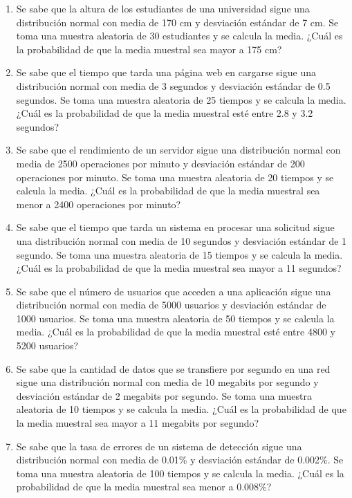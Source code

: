 \begin{Ejer}
\begin{enumerate}
\item Se sabe que la altura de los estudiantes de una universidad sigue una distribuci\'on normal con media de 170 cm y desviaci\'on est\'andar de 7 cm. Se toma una muestra aleatoria de 30 estudiantes y se calcula la media. ¿Cu\'al es la probabilidad de que la media muestral sea mayor a 175 cm?

\item Se sabe que el tiempo que tarda una p\'agina web en cargarse sigue una distribuci\'on normal con media de 3 segundos y desviaci\'on est\'andar de 0.5 segundos. Se toma una muestra aleatoria de 25 tiempos y se calcula la media. ¿Cu\'al es la probabilidad de que la media muestral est\'e entre 2.8 y 3.2 segundos?

\item Se sabe que el rendimiento de un servidor sigue una distribuci\'on normal con media de 2500 operaciones por minuto y desviaci\'on est\'andar de 200 operaciones por minuto. Se toma una muestra aleatoria de 20 tiempos y se calcula la media. ¿Cu\'al es la probabilidad de que la media muestral sea menor a 2400 operaciones por minuto?

\item Se sabe que el tiempo que tarda un sistema en procesar una solicitud sigue una distribuci\'on normal con media de 10 segundos y desviaci\'on est\'andar de 1 segundo. Se toma una muestra aleatoria de 15 tiempos y se calcula la media. ¿Cu\'al es la probabilidad de que la media muestral sea mayor a 11 segundos?

\item Se sabe que el n\'umero de usuarios que acceden a una aplicaci\'on sigue una distribuci\'on normal con media de 5000 usuarios y desviaci\'on est\'andar de 1000 usuarios. Se toma una muestra aleatoria de 50 tiempos y se calcula la media. ¿Cu\'al es la probabilidad de que la media muestral est\'e entre 4800 y 5200 usuarios?

\item Se sabe que la cantidad de datos que se transfiere por segundo en una red sigue una distribuci\'on normal con media de 10 megabits por segundo y desviaci\'on est\'andar de 2 megabits por segundo. Se toma una muestra aleatoria de 10 tiempos y se calcula la media. ¿Cu\'al es la probabilidad de que la media muestral sea mayor a 11 megabits por segundo?

\item Se sabe que la tasa de errores de un sistema de detecci\'on sigue una distribuci\'on normal con media de 0.01\% y desviaci\'on est\'andar de 0.002\%. Se toma una muestra aleatoria de 100 tiempos y se calcula la media. ¿Cu\'al es la probabilidad de que la media muestral sea menor a 0.008\%?


\end{enumerate}
\end{Ejer}
